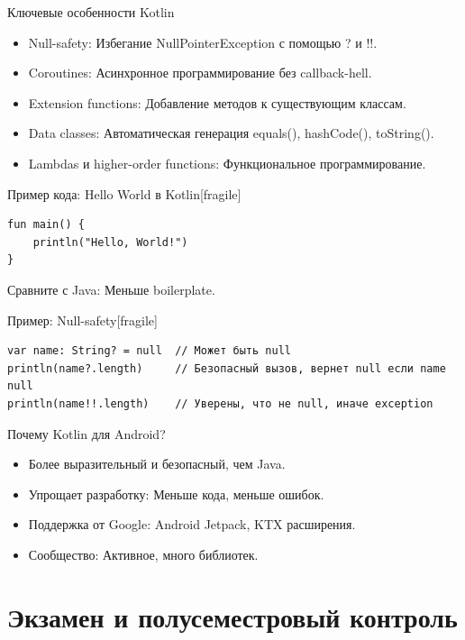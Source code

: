 \documentclass{beamer}
\begin{document}
\begin{frame}{Ключевые особенности Kotlin}
  \begin{itemize}
    \item Null-safety: Избегание NullPointerException с помощью ? и !!.
    \item Coroutines: Асинхронное программирование без callback-hell.
    \item Extension functions: Добавление методов к существующим классам.
    \item Data classes: Автоматическая генерация equals(), hashCode(), toString().
    \item Lambdas и higher-order functions: Функциональное программирование.
  \end{itemize}
\end{frame}

\begin{frame}{Пример кода: Hello World в Kotlin}[fragile]
  \begin{lstlisting}
fun main() {
    println("Hello, World!")
}
  \end{lstlisting}
  Сравните с Java: Меньше boilerplate.
\end{frame}

\begin{frame}{Пример: Null-safety}[fragile]
  \begin{lstlisting}
var name: String? = null  // Может быть null
println(name?.length)     // Безопасный вызов, вернет null если name null
println(name!!.length)    // Уверены, что не null, иначе exception
  \end{lstlisting}
\end{frame}

\begin{frame}{Почему Kotlin для Android?}
  \begin{itemize}
    \item Более выразительный и безопасный, чем Java.
    \item Упрощает разработку: Меньше кода, меньше ошибок.
    \item Поддержка от Google: Android Jetpack, KTX расширения.
    \item Сообщество: Активное, много библиотек.
  \end{itemize}
\end{frame}

\section{Экзамен и полусеместровый контроль}
\end{document}
